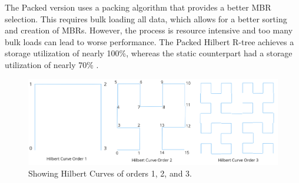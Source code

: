 The Packed version uses a packing algorithm that provides a better MBR selection. This requires bulk loading all data, which allows for a better sorting and creation of MBRs. However, the process is resource intensive and too many bulk loads can lead to worse performance. The Packed Hilbert R-tree achieves a storage utilization of nearly 100\%, whereas the static counterpart had a storage utilization of nearly 70\% \cite{rtree}.

\begin{figure}[t]
    \centering
    \includegraphics[width=\linewidth]{./figures/hilbert_orders.png}
    \caption{Showing Hilbert Curves of orders 1, 2, and 3.}
    \label{fig:hilbert}
\end{figure}

